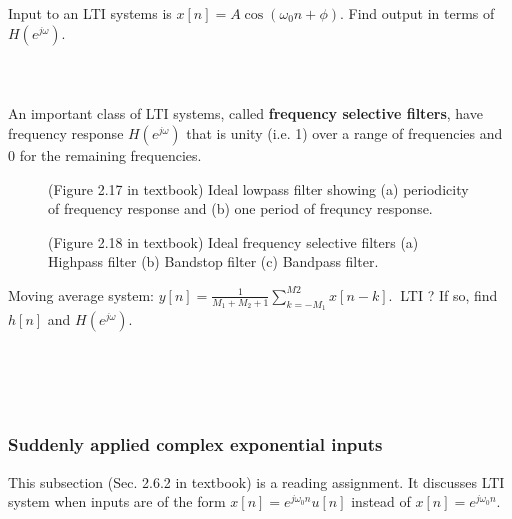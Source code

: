 \documentclass[10pt,a4paper,report]{report}       %
\newcommand{\om}{\omega}
\begin{document}
\ex Input to an LTI systems is $x[n]=A\cos(\om_0n+\phi)$. Find output in terms of $H(e^{j\om})$.\\
\vspace{2cm}\\
\vspace{1cm}\\ 
\vspace{2cm}\\ 

An important class of LTI systems, called \textbf{frequency selective filters}, have frequency response $H(e^{j \om})$ that is unity (i.e. 1) over a range of frequencies and  0 for the remaining frequencies.
\begin{figure}[h!]
\centering
\begin{minipage}{.57\textwidth}
  \centering
  \caption{}{(Figure 2.17 in textbook) Ideal lowpass filter showing (a) periodicity of frequency response and (b) one period of frequncy response.}
  \label{fig:test1}
\end{minipage}%
\begin{minipage}{.41\textwidth}
  \centering
  \caption{}{(Figure 2.18 in textbook) Ideal frequency selective filters (a) Highpass filter (b) Bandstop filter (c) Bandpass filter.}
  \label{fig:test2}
\end{minipage}
\end{figure}

\ex Moving average system: $y[n]=\frac{1}{M_1+M_2+1}\sum_{k=-M_1}^{M2}x[n-k]$.
$~$LTI ? If so, find $h[n]$ and $H(e^{j\om})$.\\
\vspace{2cm}\\
\vspace{2cm}\\
\vspace{3cm}\\
\vspace{2cm}\\

\subsubsection{Suddenly applied complex exponential inputs}
This subsection (Sec. 2.6.2 in textbook) is a reading assignment. It discusses LTI system when inputs are of the form $x[n]=e^{j\om_0 n}u[n]$ instead of $x[n]=e^{j\om_0 n}$.\\
\vspace{2cm}
\end{document}
